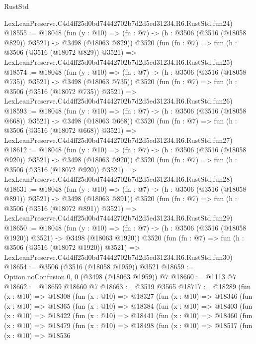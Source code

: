 \begin{lexlean}{RustStd}
\begin{coremodule}
    LexLeanPreserve.C4d4ff25d0bd74442702b7d2d5ed31234.R6.RustStd.fun24)
@18555 := @18048
    (fun (y : @10) => (fn : @7) -> (h : @3506 (@3516 (@18058 @829)) @3521) -> @3498 (@18063 @829))
    @3520
    (fun (fn : @7) =>
    fun (h : @3506 (@3516 (@18072 @829)) @3521) =>
    LexLeanPreserve.C4d4ff25d0bd74442702b7d2d5ed31234.R6.RustStd.fun25)
@18574 := @18048
    (fun (y : @10) => (fn : @7) -> (h : @3506 (@3516 (@18058 @735)) @3521) -> @3498 (@18063 @735))
    @3520
    (fun (fn : @7) =>
    fun (h : @3506 (@3516 (@18072 @735)) @3521) =>
    LexLeanPreserve.C4d4ff25d0bd74442702b7d2d5ed31234.R6.RustStd.fun26)
@18593 := @18048
    (fun (y : @10) => (fn : @7) -> (h : @3506 (@3516 (@18058 @668)) @3521) -> @3498 (@18063 @668))
    @3520
    (fun (fn : @7) =>
    fun (h : @3506 (@3516 (@18072 @668)) @3521) =>
    LexLeanPreserve.C4d4ff25d0bd74442702b7d2d5ed31234.R6.RustStd.fun27)
@18612 := @18048
    (fun (y : @10) => (fn : @7) -> (h : @3506 (@3516 (@18058 @920)) @3521) -> @3498 (@18063 @920))
    @3520
    (fun (fn : @7) =>
    fun (h : @3506 (@3516 (@18072 @920)) @3521) =>
    LexLeanPreserve.C4d4ff25d0bd74442702b7d2d5ed31234.R6.RustStd.fun28)
@18631 := @18048
    (fun (y : @10) => (fn : @7) -> (h : @3506 (@3516 (@18058 @891)) @3521) -> @3498 (@18063 @891))
    @3520
    (fun (fn : @7) =>
    fun (h : @3506 (@3516 (@18072 @891)) @3521) =>
    LexLeanPreserve.C4d4ff25d0bd74442702b7d2d5ed31234.R6.RustStd.fun29)
@18650 := @18048
    (fun (y : @10) => (fn : @7) -> (h : @3506 (@3516 (@18058 @1920)) @3521) -> @3498 (@18063 @1920))
    @3520
    (fun (fn : @7) =>
    fun (h : @3506 (@3516 (@18072 @1920)) @3521) =>
    LexLeanPreserve.C4d4ff25d0bd74442702b7d2d5ed31234.R6.RustStd.fun30)
@18654 := @3506 (@3516 (@18058 @1959)) @3521
@18659 := Option.noConfusion.{0, 0} (@3498 (@18063 @1959)) @7
@18660 := @1113 @7
@18662 := @18659 @18660 @7
@18663 := @3519 @3565
@18717 := @18289
    (fun (x : @10) =>
    @18308
      (fun (x : @10) =>
      @18327
        (fun (x : @10) =>
        @18346
          (fun (x : @10) =>
          @18365
            (fun (x : @10) =>
            @18384
              (fun (x : @10) =>
              @18403
                (fun (x : @10) =>
                @18422
                  (fun (x : @10) =>
                  @18441
                    (fun (x : @10) =>
                    @18460
                      (fun (x : @10) =>
                      @18479
                        (fun (x : @10) =>
                        @18498
                          (fun (x : @10) =>
                          @18517
                            (fun (x : @10) =>
                            @18536

\end{coremodule}
\end{lexlean}
